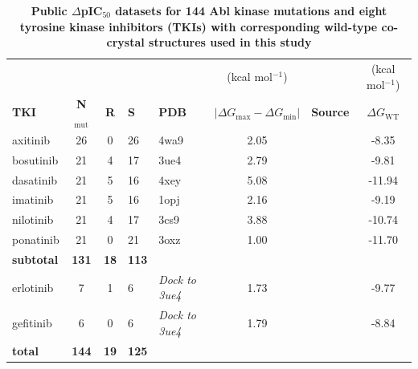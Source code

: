\documentclass[phd,tocprelim]{cornell}
\begin{document}
\begin{landscape}
\begin{table}[bt]
	\caption[ Public $\Delta$pIC$_{50}$ datasets for 144 Abl kinase mutations and eight tyrosine kinase inhibitors (TKIs) with corresponding wild-type co-crystal structures used in this study]{
		\label{tab:abl-table-1}
		{\bf Public $\Delta$pIC$_{50}$ datasets for 144 Abl kinase mutations and eight tyrosine kinase inhibitors (TKIs) with corresponding wild-type co-crystal structures used in this study}
	}
	\setlength{\tabcolsep}{4pt}
	\begin{tabularx}{\textwidth}{X c c X X S S S}
		\toprule
		&				 		&			& 			&				& {(kcal mol$^{-1}$)}  										&										& {(kcal mol$^{-1}$)}		\\
		{\bf TKI}	& {\bf N}$_\mathrm{mut}$& {\bf R}	& {\bf S}	& {\bf PDB}		& {$|\Delta G_\mathrm{max} - \Delta G_\mathrm{min}|$}	& {\bf Source}							& {$\Delta G_\mathrm{WT}$} \\
		\toprule
		axitinib	& 26					& 0			& 26		& 4wa9          & 2.05    												& \cite{Pemovska:Nature:2015}			& -8.35		\\
		bosutinib	& 21					& 4			& 17		& 3ue4         	& 2.79    												& \cite{Gozgit3992}						& -9.81		\\
		dasatinib	& 21					& 5			& 16		& 4xey        	& 5.08    												& \cite{Gozgit3992}						& -11.94	\\
		imatinib	& 21					& 5			& 16		& 1opj          & 2.16    												& \cite{Gozgit3992} 					& -9.19		\\
		nilotinib	& 21					& 4			& 17		& 3cs9       	& 3.88    												& \cite{Gozgit3992} 					& -10.74	\\
		ponatinib	& 21					& 0			& 21		& 3oxz        	& 1.00    												& \cite{Gozgit3992} 					& -11.70	\\
		{\bf subtotal}& {\bf 131}			&{\bf 18}	&{\bf 113}	& 				& 	    												& 										&	\\
		erlotinib	& 7 					& 1			& 6			& \it{Dock to 3ue4}	& 1.73    												& \cite{Davis:Nat.Biotechnol.:2011}		& -9.77		\\
		gefitinib	& 6						& 0			& 6			& \it{Dock to 3ue4}	& 1.79    												& \cite{Davis:Nat.Biotechnol.:2011}		& -8.84		\\
		{\bf total}	& {\bf 144}				&{\bf 19}	&{\bf 125}	& 				&														&										& 	\\
		\bottomrule
	\end{tabularx}

\end{table}
\end{landscape}
\end{document}
